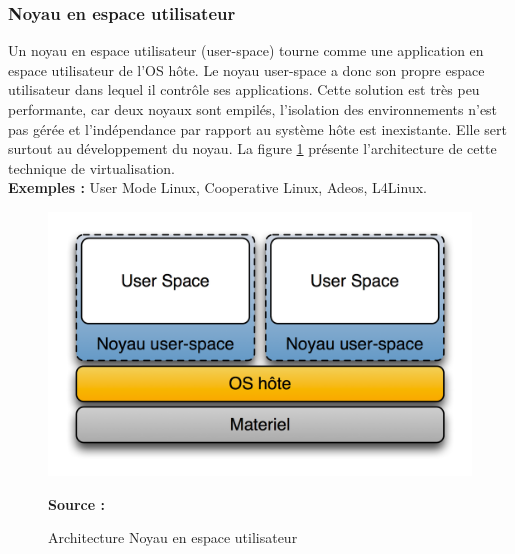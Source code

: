     \subsubsection{Noyau en espace utilisateur}
    Un noyau en espace utilisateur (user-space) tourne comme une application en espace utilisateur de l'OS hôte. Le noyau user-space a donc son propre espace utilisateur dans lequel il contrôle ses applications. Cette solution est très peu performante, car deux noyaux sont empilés, l’isolation des environnements n’est pas gérée et l’indépendance par rapport au système hôte est inexistante. Elle sert surtout au développement du noyau. La figure \ref{fig:noyau_espace_utilisateur} présente l'architecture de cette technique de virtualisation.
    \\ \textbf{Exemples :} User Mode Linux, Cooperative Linux, Adeos, L4Linux.
    \begin{figure}[htp]
      \centering
      \includegraphics[scale=.8]{fig1/noyau_espace_utilisateur.png}
      \caption{Architecture Noyau en espace utilisateur}
      \label{fig:noyau_espace_utilisateur}
      \centering \bfseries Source : \cite{online2}
    \end{figure}
    
